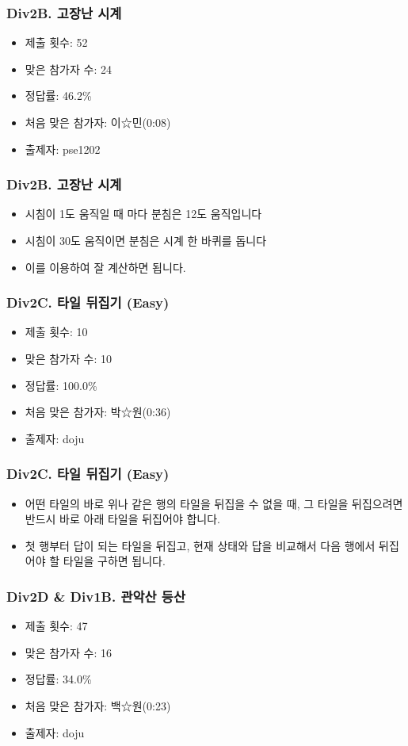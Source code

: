 \documentclass[xetex]{beamer}
\begin{document}
\begin{frame}
  \frametitle{Div2B. 고장난 시계}
  \begin{itemize}
    \item 제출 횟수: 52
    \item 맞은 참가자 수: 24
    \item 정답률: 46.2\%
    \item 처음 맞은 참가자: 이☆민(0:08)
    \item 출제자: pse1202
  \end{itemize}
\end{frame}

\begin{frame}
  \frametitle{Div2B. 고장난 시계}
  \begin{itemize}
    \item 시침이 1도 움직일 때 마다 분침은 12도 움직입니다
    \item 시침이 30도 움직이면 분침은 시계 한 바퀴를 돕니다
    \item 이를 이용하여 잘 계산하면 됩니다.
  \end{itemize}
\end{frame}

\begin{frame}
  \frametitle{Div2C. 타일 뒤집기 (Easy)}
  \begin{itemize}
    \item 제출 횟수: 10
    \item 맞은 참가자 수: 10
    \item 정답률: 100.0\%
    \item 처음 맞은 참가자: 박☆원(0:36)
    \item 출제자: doju
  \end{itemize}
\end{frame}

\begin{frame}
  \frametitle{Div2C. 타일 뒤집기 (Easy)}
  \begin{itemize}
    \item 어떤 타일의 바로 위나 같은 행의 타일을 뒤집을 수 없을 때, 그 타일을 뒤집으려면 반드시 바로 아래 타일을 뒤집어야 합니다.
    \item 첫 행부터 답이 되는 타일을 뒤집고, 현재 상태와 답을 비교해서 다음 행에서 뒤집어야 할 타일을 구하면 됩니다.
  \end{itemize}
\end{frame}

\begin{frame}
  \frametitle{Div2D \& Div1B. 관악산 등산}
  \begin{itemize}
    \item 제출 횟수: 47
    \item 맞은 참가자 수: 16
    \item 정답률: 34.0\%
    \item 처음 맞은 참가자: 백☆원(0:23)
    \item 출제자: doju
  \end{itemize}
\end{frame}
\end{document}
